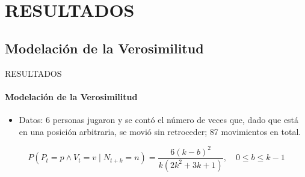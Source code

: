 \section{RESULTADOS}
\subsection{Modelación de la Verosimilitud}

\begin{frame}{RESULTADOS}
    \framesubtitle{Modelación de la Verosimilitud}
    \begin{itemize}
        \item Datos: 6 personas jugaron y se contó el número de veces que, dado que está en una posición arbitraria, se movió sin retroceder; 87 movimientos en total.
    \end{itemize}
    \begin{equation}
        P({ P }_{ t }=p\wedge { V }_{ t}=v\mid{ N }_{ t+k }=n) = \frac{6(k-b)^2}{k(2k^2 + 3k +1)}, \quad 0 \le b \le k-1
    \end{equation}


\end{frame}
